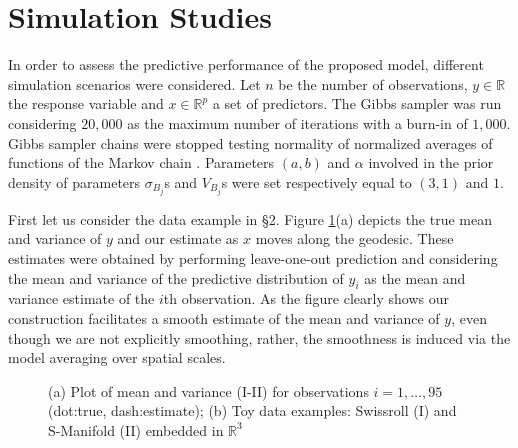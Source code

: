\documentclass{article}
\newcommand{\Real}{\mathbb{R}}
\begin{document}
\section{Simulation Studies}
In order to assess the predictive performance of the proposed model, different simulation scenarios were considered. Let $n$ be the number of observations, $y \in \Real$ the response variable and $x \in \Real^p$ a set of predictors. The Gibbs sampler was run considering $20,000$ as the maximum number of iterations with a burn-in of $1,000$. Gibbs sampler chains were stopped testing normality of normalized averages of functions of the Markov chain \cite{Chauveau98anautomated}. Parameters $(a,b)$ and $\alpha$ involved in the prior density of parameters $\sigma_{B_j}$s and $V_{B_j}$s were set respectively equal to $(3,1)$ and $1$.

First let us consider the data example in \S 2. Figure \ref{fig1}(a) depicts the true mean and variance of $y$ and our estimate as $x$ moves along the geodesic. These estimates were obtained by performing leave-one-out prediction and considering the mean and variance of the predictive distribution of $y_i$ as the mean and variance estimate of the $i$th observation. As the figure clearly shows our construction facilitates a smooth estimate of the mean and variance of $y$, even though we are not explicitly smoothing, rather, the smoothness is induced via the  model averaging over spatial scales.


\begin{figure}
    \centering
    \caption{(a) Plot of mean and variance (I-II) for observations $i=1, \ldots, 95$ (dot:true, dash:estimate); (b) Toy data examples: Swissroll (I) and S-Manifold (II) embedded in $\Real^3$}
    \label{fig1}
\end{figure}
%
\end{document}

